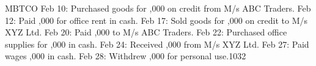 \documentclass{rvcepaper}
\begin{document}
\begin{iempaperB}
\begin{cietable}{M}{BT}{CO}
{Feb 10: Purchased goods for ,000 on credit from M/s ABC Traders.\newline
Feb 12: Paid ,000 for office rent in cash.\newline
Feb 17: Sold goods for ,000 on credit to M/s XYZ Ltd.\newline
Feb 20: Paid ,000 to M/s ABC Traders.\newline
Feb 22: Purchased office supplies for ,000 in cash.\newline
Feb 24: Received ,000 from M/s XYZ Ltd.\newline
Feb 27: Paid wages ,000 in cash.\newline
Feb 28: Withdrew ,000 for personal use.}{10}{3}{2}
\end{cietable}
\stars{*****}
\end{iempaperB}
\end{document}
